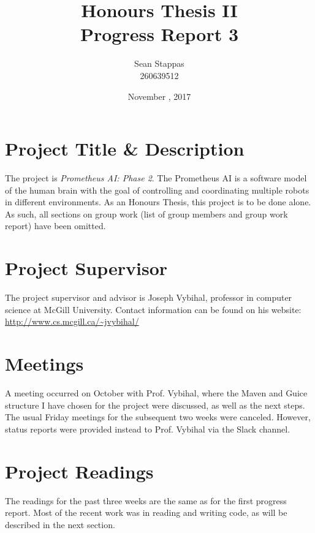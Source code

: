 \documentclass[]{article}
\title{\textbf{Honours Thesis II \\ Progress Report 3}}
\author{Sean Stappas \\ 260639512}
\date{November \nth{1}, 2017}
\begin{document}
	\maketitle
	
	\section{Project Title \& Description}
	
	The project is \emph{Prometheus AI: Phase 2}. The Prometheus AI is a software model of the human brain with the goal of controlling and coordinating multiple robots in different environments. As an Honours Thesis, this project is to be done alone. As such, all sections on group work (list of group members and group work report) have been omitted.
	
	\section{Project Supervisor}
	
	The project supervisor and advisor is Joseph Vybihal, professor in computer science at McGill University. Contact information can be found on his website: \url{http://www.cs.mcgill.ca/~jvybihal/}
	
	\section{Meetings}
	
	A meeting occurred on October  with Prof. Vybihal, where the Maven and Guice structure I have chosen for the project were discussed, as well as the next steps. The usual Friday meetings for the subsequent two weeks were canceled. However, status reports were provided instead to Prof. Vybihal via the Slack channel.
	
	\section{Project Readings} \label{sec:readings}
	
	The readings for the past three weeks are the same as for the first progress report. Most of the recent work was in reading and writing code, as will be described in the next section.
	
\end{document}

